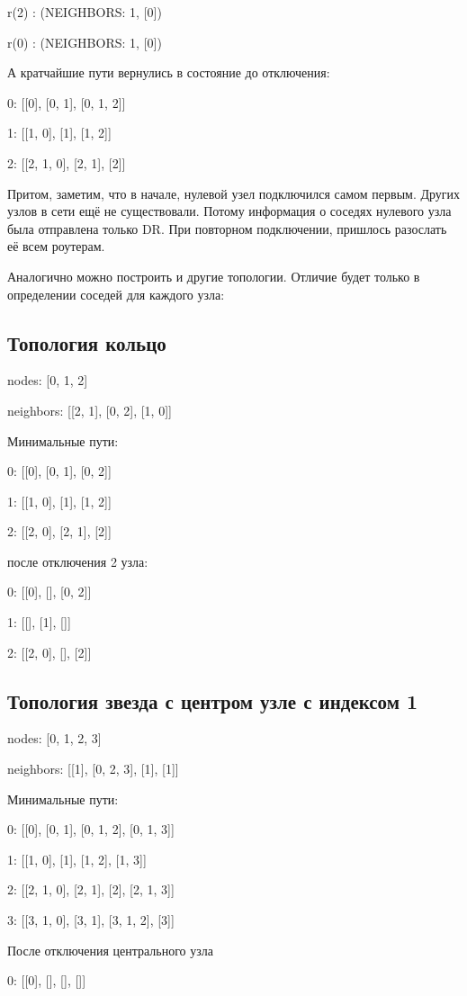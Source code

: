 \documentclass[a4paper,12pt]{article}
\begin{document}
r(2) : (NEIGHBORS: {1, [0]})

r(0) : (NEIGHBORS: {1, [0]})

А кратчайшие пути вернулись в состояние до отключения:

0: [[0], [0, 1], [0, 1, 2]]

1: [[1, 0], [1], [1, 2]]

2: [[2, 1, 0], [2, 1], [2]]

Притом, заметим, что в начале, нулевой узел подключился самом первым. Других
узлов в сети ещё не существовали. Потому информация о соседях нулевого узла была
отправлена только DR. При повторном подключении, пришлось разослать её всем
роутерам.

Аналогично можно построить и другие топологии. Отличие будет только в
определении соседей для каждого узла:

\subsection{Топология кольцо}

nodes: [0, 1, 2]

neighbors: [[2, 1], [0, 2], [1, 0]]

Минимальные пути:

0: [[0], [0, 1], [0, 2]]

1: [[1, 0], [1], [1, 2]]

2: [[2, 0], [2, 1], [2]]

после отключения 2 узла:

0: [[0], [], [0, 2]]

1: [[], [1], []]

2: [[2, 0], [], [2]]

\subsection{Топология звезда с центром узле с индексом 1}

nodes: [0, 1, 2, 3]

neighbors: [[1], [0, 2, 3], [1], [1]]

Минимальные пути:

0: [[0], [0, 1], [0, 1, 2], [0, 1, 3]]

1: [[1, 0], [1], [1, 2], [1, 3]]

2: [[2, 1, 0], [2, 1], [2], [2, 1, 3]]

3: [[3, 1, 0], [3, 1], [3, 1, 2], [3]]

После отключения центрального узла

0: [[0], [], [], []]
\end{document}
